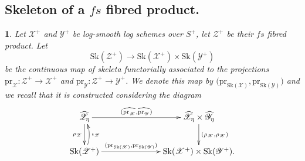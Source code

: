 \documentclass{amsart}%
\numberwithin{equation}{subsection}
\theoremstyle{plain2}
\theoremstyle{definition2}
\theoremstyle{stepstyle}
\theoremstyle{point}
\theoremstyle{subpoint}
\newtheorem{subpoint}[equation]{}%
\newcommand{\spa}[1]{\begin{subpoint}#1\end{subpoint}}           %
\newcommand{\cX}{\ensuremath{\mathscr{X}}}
\newcommand{\cY}{\ensuremath{\mathscr{Y}}}
\newcommand{\cZ}{\ensuremath{\mathscr{Z}}}
\renewcommand{\cZ}{\ensuremath{\mathscr{Z}}}
\renewcommand{\cY}{\ensuremath{\mathscr{Y}}}
\newcommand{\pr}{\mathrm{pr}}
\newcommand{\Sk}{\mathrm{Sk}}
\begin{document}
\subsection{Skeleton of a $fs$ fibred product.}
\spa{Let $\cX^+$ and $\cY^+$ be log-smooth log schemes over $S^+$, let $\cZ^+$ be their $fs$ fibred product. Let $$\Sk(\cZ^+) \rightarrow \Sk(\cX^+) \times \Sk(\cY^+)$$ be the continuous map of skeleta functorially associated to the projections $\pr_{\cX}:\cZ^+ \rightarrow \cX^+$ and $\pr_{\cY}:\cZ^+ \rightarrow \cY^+$. We denote this map by $\big(\pr_{\Sk(\cX)}, \pr_{\Sk(\cY)}\big)$ and we recall that it is constructed considering the diagram
\begin{equation} \label{diagram map on skeleta funct induced}
\begin{gathered}
\xymatrixcolsep{6pc} \xymatrix{
 \widehat{\cZ_{\eta}} \ar[r]^-{(\widehat{\pr_{\cX}}, \widehat{\pr_{\cY}})} \ar[d]_{\rho_\cZ} & \widehat{\cX_{\eta}} \times \widehat{\cY_{\eta}} \ar[d]^{(\rho_\cX, \rho_\cX)}\\
  \Sk(\cZ^+) \ar[r]^-{(\pr_{\Sk(\cX)}, \pr_{\Sk(\cY)})} \ar@/_/[u]_-{\iota_\cZ}  & \Sk(\cX^+) \times \Sk(\cY^+).
}
\end{gathered}\end{equation}
}
\end{document}
